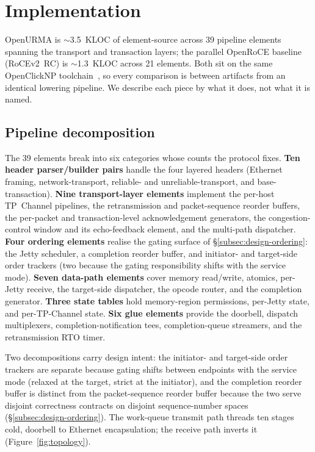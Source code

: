 \documentclass[10pt,twocolumn]{article}
\begin{document}
\section{Implementation}
\label{sec:impl}

OpenURMA is $\sim$3.5~KLOC of element-source across 39 pipeline
elements spanning the transport and transaction layers; the
parallel OpenRoCE baseline (RoCEv2~RC) is $\sim$1.3~KLOC across 21
elements. Both sit on the same OpenClickNP
toolchain~\cite{openclicknp}, so every comparison is between
artifacts from an identical lowering pipeline. We describe each
piece by what it does, not what it is named.

\subsection{Pipeline decomposition}
\label{subsec:impl-elements}

The 39 elements break into six categories whose counts the
protocol fixes. \textbf{Ten header parser/builder pairs} handle
the four layered headers (Ethernet framing, network-transport,
reliable- and unreliable-transport, and base-transaction).
\textbf{Nine transport-layer elements} implement the per-host
TP~Channel pipelines, the retransmission and packet-sequence
reorder buffers, the per-packet and transaction-level
acknowledgement generators, the congestion-control window and its
echo-feedback element, and the multi-path dispatcher.
\textbf{Four ordering elements} realise the gating surface of
\S\ref{subsec:design-ordering}: the Jetty scheduler, a
completion reorder buffer, and initiator- and target-side order
trackers (two because the gating responsibility shifts with the
service mode). \textbf{Seven data-path elements} cover memory
read/write, atomics, per-Jetty receive, the target-side
dispatcher, the opcode router, and the completion generator. \textbf{Three state tables} hold
memory-region permissions, per-Jetty state, and per-TP-Channel
state. \textbf{Six glue elements} provide the doorbell, dispatch
multiplexers, completion-notification tees, completion-queue
streamers, and the retransmission RTO timer.

Two decompositions carry design intent: the initiator- and
target-side order trackers are separate because gating shifts
between endpoints with the service mode (relaxed at the target,
strict at the initiator), and the completion reorder buffer is
distinct from the packet-sequence reorder buffer because the two
serve disjoint correctness contracts on disjoint sequence-number
spaces (\S\ref{subsec:design-ordering}). The work-queue transmit
path threads ten stages cold, doorbell to Ethernet encapsulation;
the receive path inverts it (Figure~\ref{fig:topology}).
\end{document}
